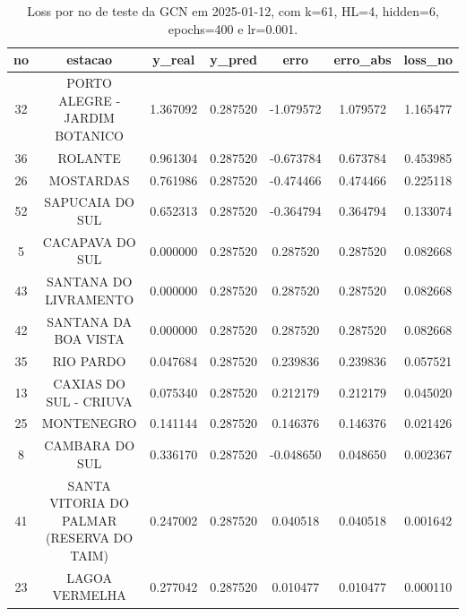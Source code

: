 \begin{table}[h]
\centering
\caption{Loss por no de teste da GCN em 2025-01-12, com k=61, HL=4, hidden=6, epochs=400 e lr=0.001.}
\label{tab:gcn_loss_k61_hl4_h6_e400_d20250112}
\begin{tabular}{ccccccc}
\toprule
no & estacao & y\_real & y\_pred & erro & erro\_abs & loss\_no \\
\midrule
32 & PORTO ALEGRE - JARDIM BOTANICO & 1.367092 & 0.287520 & -1.079572 & 1.079572 & 1.165477 \\
36 & ROLANTE & 0.961304 & 0.287520 & -0.673784 & 0.673784 & 0.453985 \\
26 & MOSTARDAS & 0.761986 & 0.287520 & -0.474466 & 0.474466 & 0.225118 \\
52 & SAPUCAIA DO SUL & 0.652313 & 0.287520 & -0.364794 & 0.364794 & 0.133074 \\
5 & CACAPAVA DO SUL & 0.000000 & 0.287520 & 0.287520 & 0.287520 & 0.082668 \\
43 & SANTANA DO LIVRAMENTO & 0.000000 & 0.287520 & 0.287520 & 0.287520 & 0.082668 \\
42 & SANTANA DA BOA VISTA & 0.000000 & 0.287520 & 0.287520 & 0.287520 & 0.082668 \\
35 & RIO PARDO & 0.047684 & 0.287520 & 0.239836 & 0.239836 & 0.057521 \\
13 & CAXIAS DO SUL - CRIUVA & 0.075340 & 0.287520 & 0.212179 & 0.212179 & 0.045020 \\
25 & MONTENEGRO & 0.141144 & 0.287520 & 0.146376 & 0.146376 & 0.021426 \\
8 & CAMBARA DO SUL & 0.336170 & 0.287520 & -0.048650 & 0.048650 & 0.002367 \\
41 & SANTA VITORIA DO PALMAR (RESERVA DO TAIM) & 0.247002 & 0.287520 & 0.040518 & 0.040518 & 0.001642 \\
23 & LAGOA VERMELHA & 0.277042 & 0.287520 & 0.010477 & 0.010477 & 0.000110 \\
\bottomrule
\end{tabular}
\end{table}
